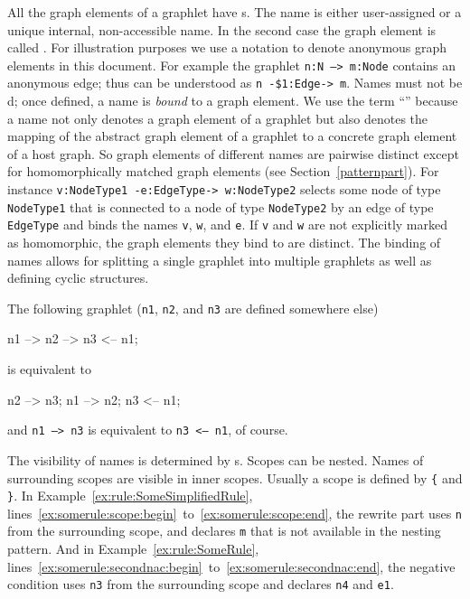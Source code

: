 All the graph elements of a graphlet have s.
The name is either user-assigned or a unique internal, non-accessible name.
In the second case the graph element is called .
For illustration purposes we use a  notation to denote anonymous graph elements in this document.
For example the graphlet \texttt{n:N --> m:Node} contains an anonymous edge; thus can be understood as \texttt{n -\$1:Edge-> m}.
Names must not be d; once defined, a name is \emph{bound} to a graph element.
We use the term ``'' because a name not only denotes a graph element of a graphlet but also denotes the mapping of the abstract graph element of a graphlet to a concrete graph element of a host graph.
So graph elements of different names are pairwise distinct except for homomorphically matched graph elements (see Section~\ref{patternpart}).
For instance \texttt{v:NodeType1 -e:EdgeType-> w:NodeType2} selects some node of type \texttt{Node\-Type1} that is connected to a node of type \texttt{NodeType2} by an edge of type \texttt{EdgeType} and binds the names \texttt{v}, \texttt{w}, and \texttt{e}.
If \texttt{v} and \texttt{w} are not explicitly marked as homomorphic, the graph elements they bind to are distinct.
The binding of names allows for splitting a single graphlet into multiple graphlets as well as defining cyclic structures.
\begin{example}
The following graphlet (\texttt{n1}, \texttt{n2}, and \texttt{n3} are defined somewhere else)
\begin{grgen}
n1 --> n2 --> n3 <-- n1;
\end{grgen}
is equivalent to
\begin{grgen}
n2 --> n3;
n1 --> n2;
n3 <-- n1;
\end{grgen}
and \texttt{n1 --> n3} is equivalent to \texttt{n3 <-- n1}, of course.
\end{example}
The visibility of names is determined by s.
Scopes can be nested.
Names of surrounding scopes are visible in inner scopes.
Usually a scope is defined by \texttt{\{} and \texttt{\}}. %
In Example~\ref{ex:rule:SomeSimplifiedRule}, lines~\ref{ex:somerule:scope:begin}~to~\ref{ex:somerule:scope:end}, 
the rewrite part uses \texttt{n} from the surrounding scope, and declares \texttt{m} that is not available in the nesting pattern.
And in Example~\ref{ex:rule:SomeRule}, lines~\ref{ex:somerule:secondnac:begin}~to~\ref{ex:somerule:secondnac:end}, the negative condition uses \texttt{n3} from the surrounding scope and declares \texttt{n4} and \texttt{e1}.

